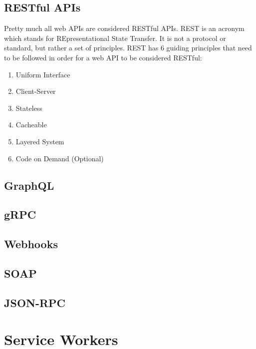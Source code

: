 \documentclass{article}
\begin{document}
\subsection{RESTful APIs}

Pretty much all web APIs are considered RESTful APIs. REST is an acronym which stands for REpresentational
State Transfer. It is not a protocol or standard, but rather a set of principles. REST has 6 guiding principles
that need to be followed in order for a web API to be considered RESTful:

\begin{enumerate}

\item Uniform Interface

\item Client-Server

\item Stateless

\item Cacheable

\item Layered System

\item Code on Demand (Optional)

\end{enumerate}

\subsection{GraphQL}

\subsection{gRPC}

\subsection{Webhooks}

\subsection{SOAP}

\subsection{JSON-RPC}

\section{Service Workers}
\end{document}
